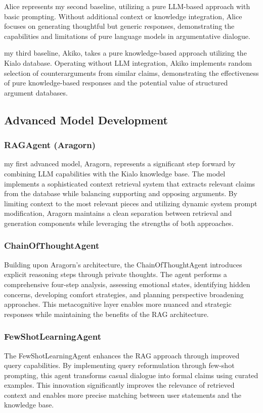 \documentclass[11pt]{article}
\begin{document}
Alice represents  my second baseline, utilizing a pure LLM-based approach with basic prompting. Without additional context or knowledge integration, Alice focuses on generating thoughtful but generic responses, demonstrating the capabilities and limitations of pure language models in argumentative dialogue.

 my third baseline, Akiko, takes a pure knowledge-based approach utilizing the Kialo database. Operating without LLM integration, Akiko implements random selection of counterarguments from similar claims, demonstrating the effectiveness of pure knowledge-based responses and the potential value of structured argument databases.

\subsection{Advanced Model Development}

\subsubsection{RAGAgent (Aragorn)}
 my first advanced model, Aragorn, represents a significant step forward by combining LLM capabilities with the Kialo knowledge base. The model implements a sophisticated context retrieval system that extracts relevant claims from the database while balancing supporting and opposing arguments. By limiting context to the most relevant pieces and utilizing dynamic system prompt modification, Aragorn maintains a clean separation between retrieval and generation components while leveraging the strengths of both approaches.

\subsubsection{ChainOfThoughtAgent}
Building upon Aragorn's architecture, the ChainOfThoughtAgent introduces explicit reasoning steps through private thoughts. The agent performs a comprehensive four-step analysis, assessing emotional states, identifying hidden concerns, developing comfort strategies, and planning perspective broadening approaches. This metacognitive layer enables more nuanced and strategic responses while maintaining the benefits of the RAG architecture.

\subsubsection{FewShotLearningAgent}
The FewShotLearningAgent enhances the RAG approach through improved query capabilities. By implementing query reformulation through few-shot prompting, this agent transforms casual dialogue into formal claims using curated examples. This innovation significantly improves the relevance of retrieved context and enables more precise matching between user statements and the knowledge base.
\end{document}
